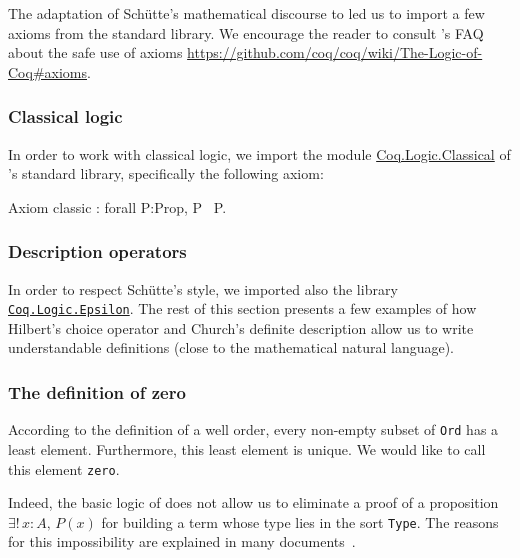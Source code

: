 The adaptation of Schütte's mathematical discourse to \coq{} led us to
import a few axioms from the standard library. We encourage the reader to consult \coq{}'s FAQ about the safe use of axioms
 \url{https://github.com/coq/coq/wiki/The-Logic-of-Coq#axioms}.

\subsubsection{Classical logic}

In order to work with classical logic, we import the module
\href{https://coq.inria.fr/distrib/current/stdlib/Coq.Logic.Classical.html}{Coq.Logic.Classical}  of \coq{}'s standard library, specifically the following axiom:

\begin{Coqsrc}
 Axiom classic : forall P:Prop, P \/ ~P.
\end{Coqsrc}


\subsubsection{Description operators}

In order to respect Schütte's style, we imported also the library 
\href{https://coq.inria.fr/distrib/current/stdlib/Coq.Logic.Epsilon.html}{\texttt{Coq.Logic.Epsilon}}.  The rest of this section presents a few examples of
how Hilbert's choice operator and Church's definite description allow us
 to write understandable definitions (close to the mathematical natural language).

\subsubsection{The definition of zero}

According to the  definition of a well order, every non-empty subset of \texttt{Ord} has a least element. Furthermore, this least element is unique. We would like to call this element  \texttt{zero}.







Indeed, the basic logic of  \coq{} does not allow us to eliminate a proof of a proposition 
$\exists!\,x:A,\,P(x)$ for building a term whose type lies in the sort \texttt{Type}. 
The reasons for this impossibility are explained in many documents~\cite{BC04, chlipalacpdt2011, Coq}.

